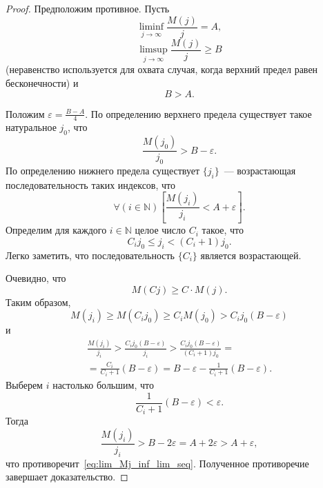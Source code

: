 \documentclass[12pt]{article}
\begin{document}
\begin{proof}
	Предположим противное.
	Пусть
	\begin{equation}
		\liminf_{j\to\infty}\frac{M(j)}{j} = A,
	\end{equation}
	\begin{equation}
		\limsup_{j\to\infty}\frac{M(j)}{j} \geq B
	\end{equation}
	(неравенство используется для охвата случая, когда верхний предел равен бесконечности)
	и
	\begin{equation}
		B > A
		.
	\end{equation}

	Положим $\varepsilon = \frac{B-A}{4}$.
	По определению верхнего предела существует такое натуральное $j_0$,
	что
	\begin{equation}
		\frac{M(j_0)}{j_0} > B - \varepsilon
		.
	\end{equation}
	По определению нижнего предела существует $\{j_i\}$~--- возрастающая последовательность таких индексов, что
	\begin{equation}
		\label{eq:lim_Mj_inf_lim_seq}
		\forall(i\in\mathbb{N})\left[ \frac{M(j_i)}{j_i} < A + \varepsilon \right]
		.
	\end{equation}
	Определим для каждого $i\in\mathbb{N}$ целое число $C_i$ такое, что
	\begin{equation}
		\label{eq:lim_Mj_inf_lim_Ci}
		C_i j_0 \leq j_i < (C_i+1)j_0
		.
	\end{equation}
	Легко заметить, что последовательность $\{C_i\}$ является возрастающей.

	Очевидно, что
	\begin{equation}
		M(Cj) \geq C \cdot M(j)
		.
	\end{equation}
	Таким образом,
	\begin{equation}
		M(j_i) \geq M(C_i j_0) \geq C_i M(j_0) > C_i j_0 (B-\varepsilon)
	\end{equation}
	и
	\begin{multline}
		\frac{M(j_i)}{j_i} > \frac{C_i j_0 (B-\varepsilon)}{j_i}
		> \frac{C_i j_0 (B-\varepsilon)}{(C_i+1)j_0}
		=
		\\=
		\frac{C_i}{C_i+1}(B-\varepsilon)
		= B-\varepsilon - \frac{1}{C_i+1}(B-\varepsilon)
		.
	\end{multline}
	Выберем $i$ настолько большим, что
	\begin{equation}
		\frac{1}{C_i+1}(B-\varepsilon) < \varepsilon
		.
	\end{equation}
	Тогда
	\begin{equation}
		\frac{M(j_i)}{j_i} > B - 2 \varepsilon = A + 2 \varepsilon > A + \varepsilon
		,
	\end{equation}
	что противоречит~\eqref{eq:lim_Mj_inf_lim_seq}.
	Полученное противоречие завершает доказательство.
\end{proof}
\end{document}
